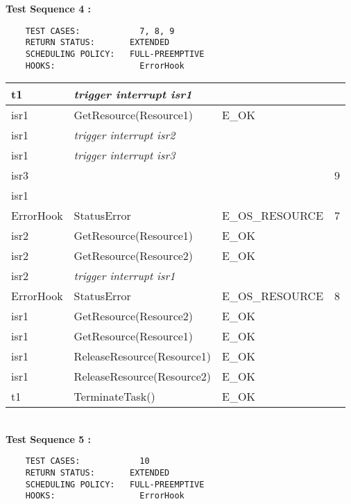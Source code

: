 \documentclass[10pt]{article}
\newlength{\Li}\settowidth{\Li}{Running}
\newlength{\Lii}\setlength{\Lii}{7cm}
\newlength{\Liiii}\setlength{\Liiii}{0.9cm}
\newlength{\Liii}\setlength{\Liii}{\textwidth} \addtolength{\Liii}{-\Li} \addtolength{\Liii}{-\Lii} \addtolength{\Liii}{-\Liiii}
\begin{document}
	\textbf{Test Sequence 4 :}
	\begin{lstlisting}
	TEST CASES:		       7, 8, 9
	RETURN STATUS:	  	 EXTENDED
	SCHEDULING POLICY:   FULL-PREEMPTIVE
	HOOKS:		           ErrorHook
	\end{lstlisting}
	

	\begin{supertabular}{|p{\Li}|p{\Lii}|p{\Liii}|p{\Liiii}|} \hline 
	t1 		& \textit{trigger interrupt isr1}					& 													& \\ \hline 
	isr1 		& GetResource(Resource1)					& E\_OK												& \\ \hline 
	isr1 		& \textit{trigger interrupt isr2}					& 													& \\ \hline 
	isr1 		& \textit{trigger interrupt isr3}					& 													& \\ \hline 
	isr3		& 										&	 												& 9 \\ \hline
	isr1		& 										& 													& \\ \hline
	ErrorHook	& StatusError								& E\_OS\_RESOURCE									& 7 \\ \hline
	isr2 		& GetResource(Resource1)					& E\_OK												& \\ \hline 
	isr2 		& GetResource(Resource2)					& E\_OK												& \\ \hline 
	isr2 		& \textit{trigger interrupt isr1}					& 													& \\ \hline 
	ErrorHook	& StatusError								& E\_OS\_RESOURCE									& 8 \\ \hline
	isr1 		& GetResource(Resource2)					& E\_OK												& \\ \hline 
	isr1 		& GetResource(Resource1)					& E\_OK												& \\ \hline 
	isr1 		& ReleaseResource(Resource1)				& E\_OK												& \\ \hline 
	isr1 		& ReleaseResource(Resource2)				& E\_OK												& \\ \hline 
	t1 		& TerminateTask()							& E\_OK												& \\ \hline 
	\end{supertabular}\\
	
	\textbf{Test Sequence 5 :}
	\begin{lstlisting}
	TEST CASES:		       10
	RETURN STATUS:	  	 EXTENDED
	SCHEDULING POLICY:   FULL-PREEMPTIVE
	HOOKS:		           ErrorHook
	\end{lstlisting}
	
\end{document}
